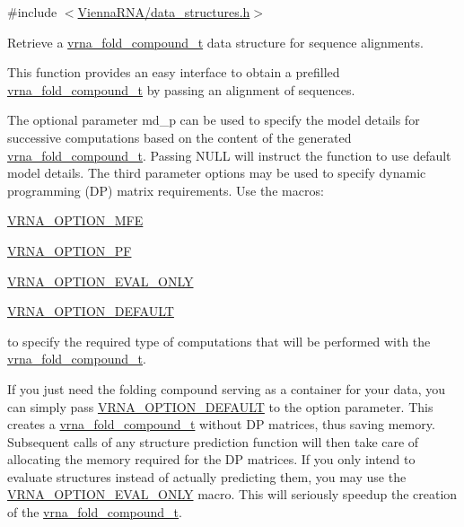 {\ttfamily \#include $<$\hyperlink{data__structures_8h}{Vienna\+R\+N\+A/data\+\_\+structures.\+h}$>$}



Retrieve a \hyperlink{group__fold__compound_ga1b0cef17fd40466cef5968eaeeff6166}{vrna\+\_\+fold\+\_\+compound\+\_\+t} data structure for sequence alignments. 

This function provides an easy interface to obtain a prefilled \hyperlink{group__fold__compound_ga1b0cef17fd40466cef5968eaeeff6166}{vrna\+\_\+fold\+\_\+compound\+\_\+t} by passing an alignment of sequences.

The optional parameter {\ttfamily md\+\_\+p} can be used to specify the model details for successive computations based on the content of the generated \hyperlink{group__fold__compound_ga1b0cef17fd40466cef5968eaeeff6166}{vrna\+\_\+fold\+\_\+compound\+\_\+t}. Passing N\+U\+LL will instruct the function to use default model details. The third parameter {\ttfamily options} may be used to specify dynamic programming (DP) matrix requirements. Use the macros\+:


\begin{DoxyItemize}
\item \hyperlink{group__fold__compound_gae63be9127fe7dcc1f9bb14f5bb1064ee}{V\+R\+N\+A\+\_\+\+O\+P\+T\+I\+O\+N\+\_\+\+M\+FE}
\item \hyperlink{group__fold__compound_gabfbadcddda3e74ce7f49035ef8f058f7}{V\+R\+N\+A\+\_\+\+O\+P\+T\+I\+O\+N\+\_\+\+PF}
\item \hyperlink{group__fold__compound_ga61469c423131552c8483229f8b6c7e0e}{V\+R\+N\+A\+\_\+\+O\+P\+T\+I\+O\+N\+\_\+\+E\+V\+A\+L\+\_\+\+O\+N\+LY}
\item \hyperlink{group__fold__compound_gacea5b7ee6181c485f36e2afa0e9089e4}{V\+R\+N\+A\+\_\+\+O\+P\+T\+I\+O\+N\+\_\+\+D\+E\+F\+A\+U\+LT}
\end{DoxyItemize}

to specify the required type of computations that will be performed with the \hyperlink{group__fold__compound_ga1b0cef17fd40466cef5968eaeeff6166}{vrna\+\_\+fold\+\_\+compound\+\_\+t}.

If you just need the folding compound serving as a container for your data, you can simply pass \hyperlink{group__fold__compound_gacea5b7ee6181c485f36e2afa0e9089e4}{V\+R\+N\+A\+\_\+\+O\+P\+T\+I\+O\+N\+\_\+\+D\+E\+F\+A\+U\+LT} to the {\ttfamily option} parameter. This creates a \hyperlink{group__fold__compound_ga1b0cef17fd40466cef5968eaeeff6166}{vrna\+\_\+fold\+\_\+compound\+\_\+t} without DP matrices, thus saving memory. Subsequent calls of any structure prediction function will then take care of allocating the memory required for the DP matrices. If you only intend to evaluate structures instead of actually predicting them, you may use the \hyperlink{group__fold__compound_ga61469c423131552c8483229f8b6c7e0e}{V\+R\+N\+A\+\_\+\+O\+P\+T\+I\+O\+N\+\_\+\+E\+V\+A\+L\+\_\+\+O\+N\+LY} macro. This will seriously speedup the creation of the \hyperlink{group__fold__compound_ga1b0cef17fd40466cef5968eaeeff6166}{vrna\+\_\+fold\+\_\+compound\+\_\+t}.

